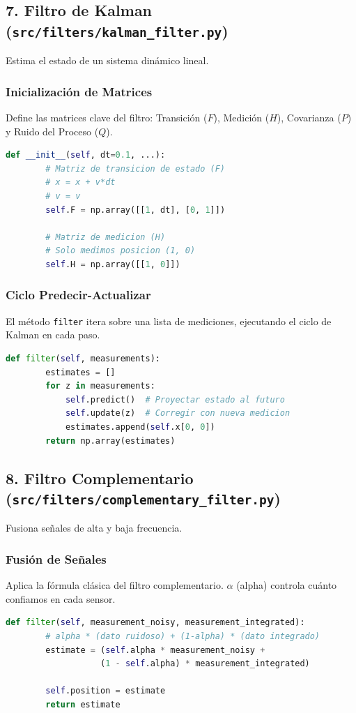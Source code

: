 \documentclass[12pt, a4paper]{article}
\begin{document}
\newpage
\subsection{7. Filtro de Kalman (\texttt{src/filters/kalman\_filter.py})}
Estima el estado de un sistema dinámico lineal.

\subsubsection{Inicialización de Matrices}
Define las matrices clave del filtro: Transición ($F$), Medición ($H$), Covarianza ($P$) y Ruido del Proceso ($Q$).
\begin{lstlisting}[language=Python]
    def __init__(self, dt=0.1, ...):
        # Matriz de transicion de estado (F)
        # x = x + v*dt
        # v = v
        self.F = np.array([[1, dt], [0, 1]])
        
        # Matriz de medicion (H)
        # Solo medimos posicion (1, 0)
        self.H = np.array([[1, 0]])
\end{lstlisting}

\subsubsection{Ciclo Predecir-Actualizar}
El método \texttt{filter} itera sobre una lista de mediciones, ejecutando el ciclo de Kalman en cada paso.
\begin{lstlisting}[language=Python]
    def filter(self, measurements):
        estimates = []
        for z in measurements:
            self.predict()  # Proyectar estado al futuro
            self.update(z)  # Corregir con nueva medicion
            estimates.append(self.x[0, 0])
        return np.array(estimates)
\end{lstlisting}

\newpage
\subsection{8. Filtro Complementario (\texttt{src/filters/complementary\_filter.py})}
Fusiona señales de alta y baja frecuencia.

\subsubsection{Fusión de Señales}
Aplica la fórmula clásica del filtro complementario. $\alpha$ (alpha) controla cuánto confiamos en cada sensor.
\begin{lstlisting}[language=Python]
    def filter(self, measurement_noisy, measurement_integrated):
        # alpha * (dato ruidoso) + (1-alpha) * (dato integrado)
        estimate = (self.alpha * measurement_noisy + 
                   (1 - self.alpha) * measurement_integrated)
        
        self.position = estimate
        return estimate
\end{lstlisting}
\end{document}
